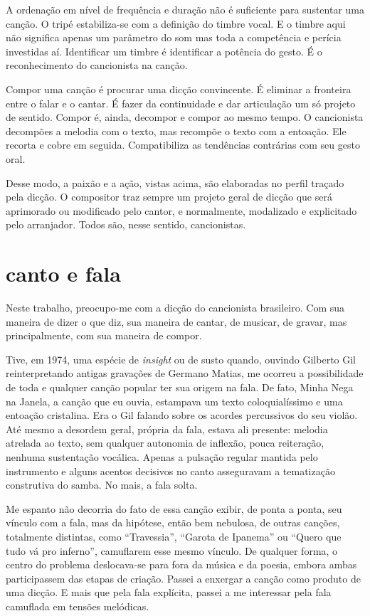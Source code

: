 A ordenação em nível de frequência e duração não é suficiente para
sustentar uma canção. O tripé estabiliza-se com a definição do timbre
vocal. E o timbre aqui não significa apenas um parâmetro do som mas toda
a competência e perícia investidas aí. Identificar um timbre é
identificar a potência do gesto. É o reconhecimento do cancionista na
canção.

Compor uma canção é procurar uma dicção convincente. É eliminar a
fronteira entre o falar e o cantar. É fazer da continuidade e dar
articulação um só projeto de sentido. Compor é, ainda, decompor e compor
ao mesmo tempo. O cancionista decompões a melodia com o texto, mas
recompõe o texto com a entoação. Ele recorta e cobre em seguida.
Compatibiliza as tendências contrárias com seu gesto oral.

Desse modo, a paixão e a ação, vistas acima, são elaboradas no perfil
traçado pela dicção. O compositor traz sempre um projeto geral de dicção
que será aprimorado ou modificado pelo cantor, e normalmente, modalizado
e explicitado pelo arranjador. Todos são, nesse sentido, cancionistas.

\section{canto e fala}

Neste trabalho, preocupo-me com a dicção do cancionista brasileiro. Com
sua maneira de dizer o que diz, sua maneira de cantar, de musicar, de
gravar, mas principalmente, com sua maneira de compor.

Tive, em 1974, uma espécie de \textit{insight} ou de susto quando, ouvindo
Gilberto Gil reinterpretando antigas gravações de Germano Matias, me
ocorreu a possibilidade de toda e qualquer canção popular ter sua origem
na fala. De fato, Minha Nega na Janela, a canção que eu ouvia, estampava
um texto coloquialíssimo e uma entoação cristalina. Era o Gil falando
sobre os acordes percussivos do seu violão. Até mesmo a desordem geral,
própria da fala, estava ali presente: melodia atrelada ao texto, sem
qualquer autonomia de inflexão, pouca reiteração, nenhuma sustentação
vocálica. Apenas a pulsação regular mantida pelo instrumento e alguns
acentos decisivos no canto asseguravam a tematização construtiva do
samba. No mais, a fala solta.

Me espanto não decorria do fato de essa canção exibir, de ponta a ponta,
seu vínculo com a fala, mas da hipótese, então bem nebulosa, de outras
canções, totalmente distintas, como ``Travessia'', ``Garota de Ipanema'' ou
``Quero que tudo vá pro inferno'', camuflarem esse mesmo vínculo. De
qualquer forma, o centro do problema deslocava-se para fora da música e
da poesia, embora ambas participassem das etapas de criação. Passei a
enxergar a canção como produto de uma dicção. E mais que pela fala
explícita, passei a me interessar pela fala camuflada em tensões
melódicas.

